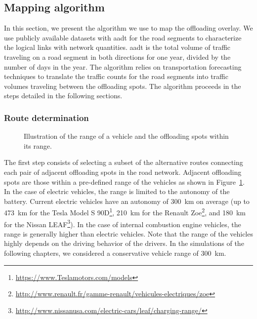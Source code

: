 \subsection{Mapping algorithm}
\label{sec:mapping-offloading-overlay}

In this section, we present the algorithm we use to map the offloading overlay. We use publicly available datasets with \acrfull{aadt} for the road segments to characterize the logical links with network quantities. \Acrshort{aadt} is the total volume of traffic traveling on a road segment in both directions for one year, divided by the number of days in the year. The algorithm relies on transportation forecasting techniques to translate the traffic counts for the road segments into traffic volumes traveling between the offloading spots. The algorithm proceeds in the steps detailed in the following sections.

\subsubsection{Route determination}
\label{sec:route-determination}

\begin{figure}
    
    \caption{Illustration of the range of a vehicle and the offloading spots within its range.}
    \label{fig:vehicle-range}
\end{figure}

The first step consists of selecting a subset of the alternative routes connecting each pair of adjacent offloading spots in the road network. Adjacent offloading spots are those within a pre-defined range of the vehicles as shown in Figure~\ref{fig:vehicle-range}. In the case of electric vehicles, the range is limited to the autonomy of the battery. Current electric vehicles have an autonomy of 300~km on average (\eg up to 473~km for the Tesla Model S 90D\footnote{\url{https://www.Teslamotors.com/models}}, 210~km for the Renault Zoe\footnote{\url{http://www.renault.fr/gamme-renault/vehicules-electriques/zoe}}, and 180~km for the Nissan LEAF\footnote{\url{http://www.nissanusa.com/electric-cars/leaf/charging-range/}}). In the case of internal combustion engine vehicles, the range is generally higher than electric vehicles. Note that the range of the vehicles highly depends on the driving behavior of the drivers. In the simulations of the following chapters, we considered a conservative vehicle range of 300~km.

